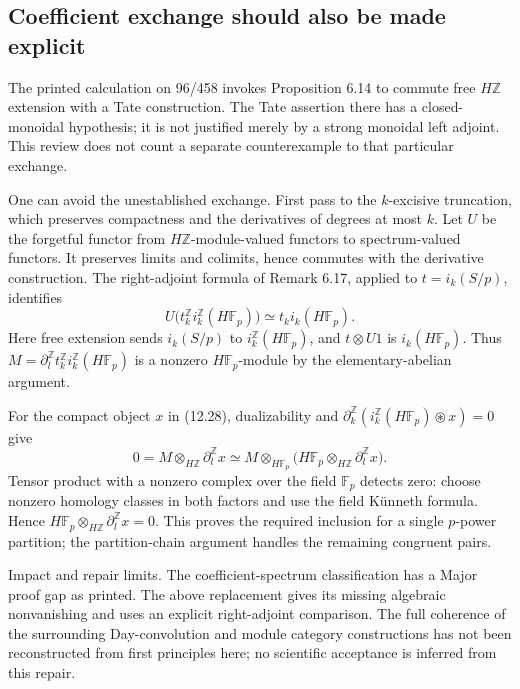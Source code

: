 \documentclass[10pt]{article}
\begin{document}
\subsection*{Coefficient exchange should also be made explicit}
The printed calculation on 96/458 invokes Proposition 6.14 to commute free \(H\mathbb Z\) extension with a Tate construction. The Tate assertion there has a closed-monoidal hypothesis; it is not justified merely by a strong monoidal left adjoint. This review does not count a separate counterexample to that particular exchange.\par
One can avoid the unestablished exchange. First pass to the \(k\)-excisive truncation, which preserves compactness and the derivatives of degrees at most \(k\). Let \(U\) be the forgetful functor from \(H\mathbb Z\)-module-valued functors to spectrum-valued functors. It preserves limits and colimits, hence commutes with the derivative construction. The right-adjoint formula of Remark 6.17, applied to \(t=i_k(S/p)\), identifies \[U\bigl(t_k^\mathbb Zi_k^\mathbb Z(H\mathbb F_p)\bigr)
       \simeq t_k i_k(H\mathbb F_p).\] Here free extension sends \(i_k(S/p)\) to \(i_k^\mathbb Z(H\mathbb F_p)\), and \(t\otimes U1\) is \(i_k(H\mathbb F_p)\). Thus \(M=\partial_l^\mathbb Zt_k^\mathbb Zi_k^\mathbb Z(H\mathbb F_p)\) is a nonzero \(H\mathbb F_p\)-module by the elementary-abelian argument.\par
For the compact object \(x\) in (12.28), dualizability and \(\partial_k^\mathbb Z(i_k^\mathbb Z(H\mathbb F_p)\mathbin{\circledast}x)=0\) give \[0=M\otimes_{H\mathbb Z}\partial_l^\mathbb Zx
   \simeq
 M\otimes_{H\mathbb F_p}
       \bigl(H\mathbb F_p\otimes_{H\mathbb Z}\partial_l^\mathbb Zx\bigr).\] Tensor product with a nonzero complex over the field \(\mathbb F_p\) detects zero: choose nonzero homology classes in both factors and use the field Künneth formula. Hence \(H\mathbb F_p\otimes_{H\mathbb Z}\partial_l^\mathbb Zx=0\). This proves the required inclusion for a single \(p\)-power partition; the partition-chain argument handles the remaining congruent pairs.\par
Impact and repair limits. The coefficient-spectrum classification has a Major proof gap as printed. The above replacement gives its missing algebraic nonvanishing and uses an explicit right-adjoint comparison. The full coherence of the surrounding Day-convolution and module category constructions has not been reconstructed from first principles here; no scientific acceptance is inferred from this repair.\par
\end{document}
